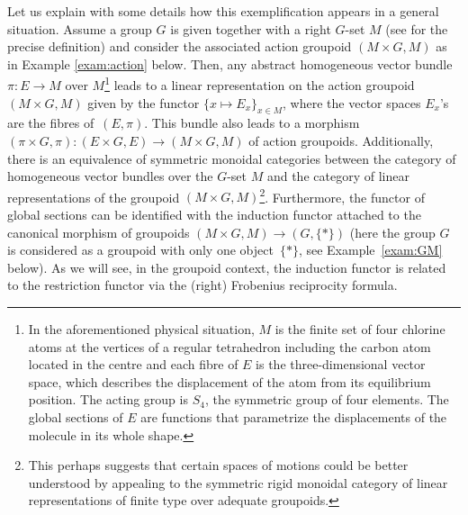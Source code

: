 \documentclass[10pt,a4paper]{amsart}
\numberwithin{equation}{section}
\newcommand{\Sscript}[1]{\scriptscriptstyle{#1}}
\begin{document}
Let us explain with some details how this exemplification appears in a general situation. Assume a group $G$ is given together with a right $G$-set $M$ (see \cite{Bouc:2010} for the precise definition) and consider the associated action groupoid $(M\times G, M)$ as in Example \ref{exam:action} below. Then, any abstract homogeneous vector bundle $\pi\colon E \to M$ over $M$\footnote{In the aforementioned physical situation, $M$ is the finite set of four chlorine atoms at the vertices of a regular tetrahedron including the carbon atom located in the centre and each fibre of $E$ is the three-dimensional vector space, which describes the displacement of the atom from its equilibrium position. The acting group is $S_{\Sscript{4}}$, the symmetric group of four elements. The global sections of $E$ are functions that parametrize the displacements of the molecule in its whole shape.} leads to a linear representation on the action groupoid $(M\times G, M)$ given by the functor $\{x \mapsto E_{\Sscript{x}}\}_{\Sscript{x \in M}}$, where the vector spaces $E_x$'s are the fibres of~$(E,\pi)$. This bundle also leads to a morphism $(\pi \times G, \pi)\colon (E \times G, E) \to (M\times G, M)$ of action groupoids. Additionally, there is an equivalence of symmetric monoidal categories between the category of homogeneous vector bundles over the $G$-set $M$ and the category of linear representations of the groupoid $(M\times G, M)$\footnote{This perhaps suggests that certain spaces of motions could be better understood by appealing to the symmetric rigid monoidal category of linear representations of finite type over adequate groupoids.}. Furthermore, the functor of global sections can be identified with the induction functor attached to the canonical morphism of groupoids
$(M\times G, M) \to (G,\{*\})$ (here the group $G$ is considered as a groupoid with only one object~$\{*\}$, see Example~\ref{exam:GM} below). As we will see, in the groupoid context, the induction functor is related to the restriction functor via the (right) Frobenius reciprocity formula.
\end{document}
